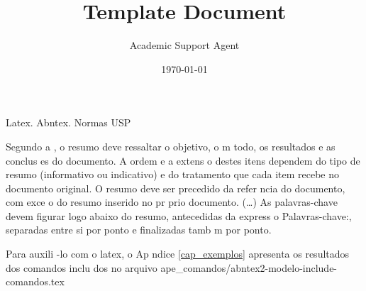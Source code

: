 \documentclass{article}
\title{Template Document}
\author{Academic Support Agent}
\date{\today}
\begin{document}
\maketitle

\renewcommand{\orientadorname}{Orientador: }
\renewcommand{\coorientadorname}{Coorientador: }
\renewcommand{\agradecimentosname}{Agradecimentos}

\pretextual

\maketitle






\begin{resumo}{Latex. Abntex. Normas USP}

 	 Segundo a , o resumo deve ressaltar o  objetivo, o m todo, os resultados e as conclus es do documento. A ordem e a extens o  destes itens dependem do tipo de resumo (informativo ou indicativo) e do  tratamento que cada item recebe no documento original. O resumo deve ser  precedido da refer ncia do documento, com exce o do resumo inserido no  pr prio documento. (\ldots) As palavras-chave devem figurar logo abaixo do  resumo, antecedidas da express o Palavras-chave:, separadas entre si por  ponto e finalizadas tamb m por ponto.
     
    Para auxili -lo com o latex, o Ap ndice 
  \ref{cap_exemplos} apresenta os resultados dos comandos inclu dos no arquivo ape\_comandos/abntex2-modelo-include-comandos.tex 

\end{resumo}
\end{document}
